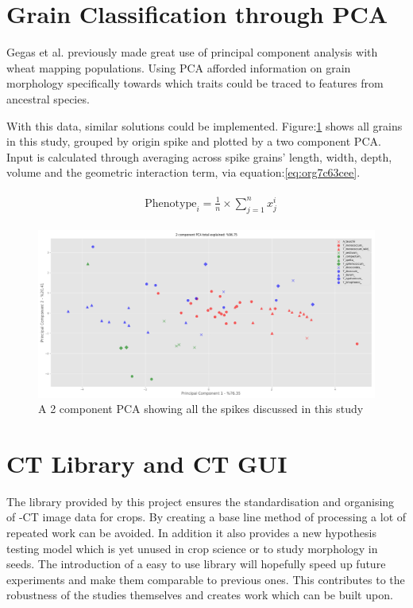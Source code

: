 \documentclass[11pt]{report}
\begin{document}
\section{Grain Classification through PCA}
\label{sec:orgb9dd225}
Gegas et al. previously made great use of principal component analysis with wheat mapping populations. Using PCA afforded information on grain morphology specifically towards which traits could be traced to features from ancestral species.

With this data, similar solutions could be implemented. Figure:\ref{fig:org8f15620} shows all grains in this study, grouped by origin spike and plotted by a two component PCA. Input is calculated through averaging across spike grains' length, width, depth, volume and the geometric interaction term, via equation:\ref{eq:org7c63cee}.

 \begin{align}
\label{eq:org7c63cee}
   &\begin{aligned}
\text{Phenotype}_i = \frac{1}{n}\times\sum^n_{j=1}{x^i_j}
   \end{aligned}
 \end{align}


\begin{figure}[htbp]
\centering
\includegraphics[width=.9\linewidth]{./images/pca_all.png}
\caption{\label{fig:org8f15620}
A 2 component PCA showing all the spikes discussed in this study}
\end{figure}

\section{CT Library and CT GUI}
\label{sec:org4eeaadd}

The library provided by this project ensures the standardisation and organising of \textmu{}-CT image data for crops. By creating a base line method of processing a lot of repeated work can be avoided. In addition it also provides a new hypothesis testing model which is yet unused in crop science or to study morphology in seeds. The introduction of a easy to use library will hopefully speed up future experiments and make them comparable to previous ones. This contributes to the robustness of the studies themselves and creates work which can be built upon.
\end{document}
